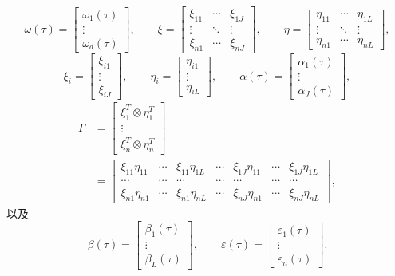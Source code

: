 \[
\omega(\tau)=\begin{bmatrix}\omega_1(\tau)\\\vdots\\\omega_d(\tau)\end{bmatrix},\qquad
\xi=\begin{bmatrix}\xi_{11}&\cdots&\xi_{1J}\\\vdots&\ddots&\vdots\\\xi_{n1}&\cdots&\xi_{nJ}\end{bmatrix},\qquad
\eta=\begin{bmatrix}\eta_{11}&\cdots&\eta_{1L}\\\vdots&\ddots&\vdots\\\eta_{n1}&\cdots&\eta_{nL}\end{bmatrix},
\]
\[
\xi_i=\begin{bmatrix}\xi_{i1}\\\vdots\\\xi_{iJ}\end{bmatrix},\qquad
\eta_i=\begin{bmatrix}\eta_{i1}\\\vdots\\\eta_{iL}\end{bmatrix},\qquad
\alpha(\tau)=\begin{bmatrix}\alpha_1(\tau)\\\vdots\\\alpha_J(\tau)\end{bmatrix},
\]
\[
\begin{aligned}
\Gamma&=\begin{bmatrix}\xi_1^T\otimes\eta_1^T\\\vdots\\\xi_n^T\otimes\eta_n^T\end{bmatrix}\\
&=\begin{bmatrix}
\xi_{11}\eta_{11}&\cdots&\xi_{11}\eta_{1L}&\cdots&\xi_{1J}\eta_{11}&\cdots&\xi_{1J}\eta_{1L}\\
\cdots&\cdots&\cdots&\cdots&\cdots&\cdots&\cdots\\
\xi_{n1}\eta_{n1}&\cdots&\xi_{n1}\eta_{nL}&\cdots&\xi_{nJ}\eta_{n1}&\cdots&\xi_{nJ}\eta_{nL}
\end{bmatrix},
\end{aligned}
\]
以及
\[
\beta(\tau)=\begin{bmatrix}\beta_1(\tau)\\\vdots\\\beta_L(\tau)\end{bmatrix},\qquad
\varepsilon(\tau)=\begin{bmatrix}\varepsilon_1(\tau)\\\vdots\\\varepsilon_n(\tau)\end{bmatrix}.
\]
